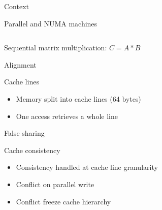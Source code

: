 \documentclass[xcolor={usenames,dvipsnames},hyperref={pdfusetitle}]{beamer}
\begin{document}
\begin{section}{Context}
\begin{frame}{Parallel and NUMA machines}
    \begin{columns}
        \begin{column}{.2\linewidth}
            \begin{block}{}
            \end{block}
        \end{column}
        \begin{column}{.8\linewidth}
            \resizebox{!}{.75\textheight}{
                \centering
                
            }
        \end{column}
    \end{columns}
\end{frame}

\begin{frame}{Sequential matrix multiplication: $C=A*B$}
    \centering
    \scalebox{.6}{
        
    }
\end{frame}

\begin{frame}{Alignment}
    \hspace{-40pt}
    \scalebox{.8}{
        
    }
    \begin{block}{Cache lines}
        \begin{itemize}
            \item Memory split into cache lines (64 bytes)
            \item<alert@1-> One access retrieves a whole line
        \end{itemize}
    \end{block}
\end{frame}

\begin{frame}{False sharing}
    \hspace{-35pt}
    \scalebox{.8}{
        
    }
    \vspace{20pt}
    \begin{block}{Cache consistency}
        \begin{itemize}
            \item Consistency handled at cache line granularity
            \item<alert@1-> Conflict on parallel write
            \item Conflict freeze cache hierarchy
        \end{itemize}
    \end{block}
\end{frame}


\end{section}
\end{document}
